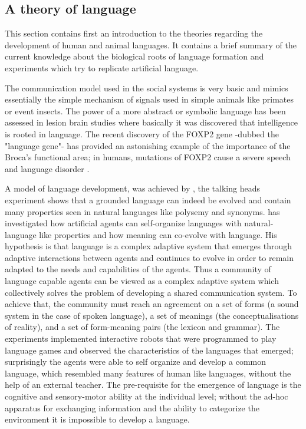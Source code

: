 \subsection{A theory of language \label{Conclusion:Language}}

This section contains first an introduction to the theories regarding the development
of human and animal languages.
It contains a brief summary of the current knowledge about the biological
roots of language formation and experiments which try to replicate artificial
language.

The communication model used in the social systems is very basic and mimics essentially
the simple mechanism of signals used in simple animals like primates or event insects.
The power of a more abstract or symbolic language has been assessed in lesion brain
studies where basically it was discovered that intelligence is rooted in language.
The recent discovery of the FOXP2 gene -dubbed the "language gene"- has provided
an astonishing example of the importance of the Broca's functional area;
in humans, mutations of FOXP2 cause a severe speech and language
disorder \citep{FoxP2Gene:Nature:2001,FOXP2Identification:2005}.

A model of language development, was achieved by \citet{Steels:1998:OriginsOntologies,Steels:1999:TalkingHeads}, 
the talking heads experiment shows that a grounded language can indeed be
evolved and contain many properties seen in natural languages like polysemy and
synonyms.
\citet{Steels:1999:TalkingHeads} has investigated how artificial agents can self-organize
languages with natural-language like properties and how meaning can co-evolve
with language. His hypothesis is that language is a
complex adaptive system that emerges through adaptive interactions between
agents and continues to evolve in order to remain adapted to the needs and
capabilities of the agents.
Thus a community of language capable agents can be viewed as a complex adaptive
system which collectively solves the problem of developing a shared
communication system.
To achieve that, the community must reach an agreement on a set of forms
(a sound system in the case of spoken language), a set of meanings (the
conceptualisations of reality), and a set of form-meaning pairs (the
lexicon and grammar).
The experiments implemented interactive robots that were programmed to play language games and
observed the characteristics of the languages that emerged; surprisingly the
agents were able to self organize and develop a common language, which resembled many features of human like
languages, without the help of an external teacher. 
The pre-requisite for the emergence of language is the cognitive and
 sensory-motor ability at the individual level; without the ad-hoc apparatus for
exchanging information and the ability to categorize the environment it is impossible to develop a language.

